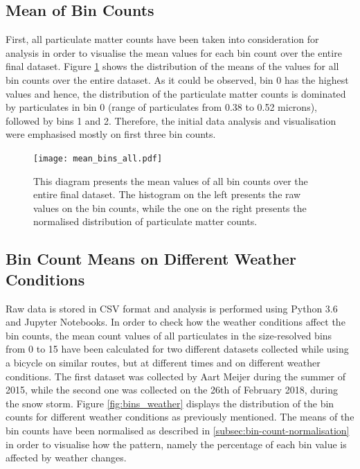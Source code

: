 \documentclass[bsc,frontabs,twoside,singlespacing,parskip,deptreport]{infthesis}     %
\begin{document}
\subsection{Mean of Bin Counts}
\label{subsec:bin-count-means}

First, all particulate matter counts have been taken into consideration for analysis in order to visualise the mean values for each bin count over the entire final dataset. Figure \ref{fig:mean_bins_all} shows the distribution of the means of the values for all bin counts over the entire dataset. As it could be observed, bin 0 has the highest values and hence, the distribution of the particulate matter counts is dominated by particulates in bin 0 (range of particulates from 0.38 to 0.52 microns), followed by bins 1 and 2. Therefore, the initial data analysis and visualisation were emphasised mostly on first three bin counts.

\begin{figure}[h!]
  \center
  \texttt{[image: mean\_bins\_all.pdf]}
  \caption{This diagram presents the mean values of all bin counts over the entire final dataset. The histogram on the left presents the raw values on the bin counts, while the one on the right presents the normalised distribution of particulate matter counts.}
  \label{fig:mean_bins_all}
\end{figure}


\subsection{Bin Count Means on Different Weather Conditions}
\label{subsec:different-weather}

Raw data is stored in CSV format and analysis is performed using Python 3.6 and Jupyter Notebooks. In order to check how the weather conditions affect the bin counts, the mean count values of all particulates in the size-resolved bins from 0 to 15 have been calculated for two different datasets collected while using a bicycle on similar routes, but at different times and on different weather conditions. The first dataset was collected by Aart Meijer during the summer of 2015, while the second one was collected on the 26th of February 2018, during the snow storm. Figure \ref{fig:bins_weather} displays the distribution of the bin counts for different weather conditions as previously mentioned. The means of the bin counts have been normalised as described in \ref{subsec:bin-count-normalisation} in order to visualise how the pattern, namely the percentage of each bin value is affected by weather changes.
\end{document}
